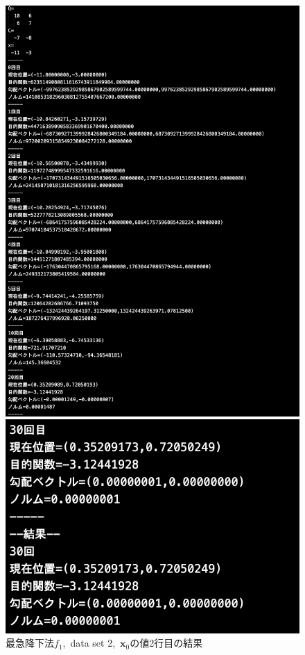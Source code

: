 \documentclass[12pt]{jarticle}
\begin{document}
\clearpage
\begin{figure}[h]
    \begin{center}
        \includegraphics[scale=0.2]{kadai1_1s_out2_2_1.png}
    \end{center}
    \begin{center}
        \includegraphics[scale=0.4]{kadai1_1s_out2_2_2.png}
    \end{center}
    \caption{最急降下法$f_1$,\ data set 2,\ $\boldsymbol{x}_0$の値2行目の結果}
\end{figure}
\end{document}
